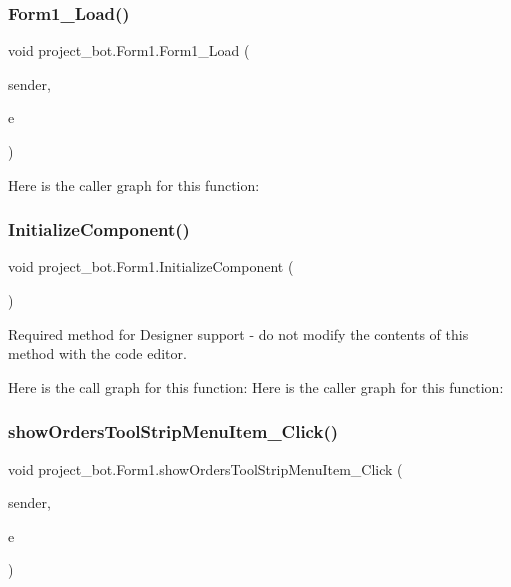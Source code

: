 \subsubsection{\texorpdfstring{Form1\+\_\+\+Load()}{Form1\_Load()}}
{\footnotesize\ttfamily void project\+\_\+bot.\+Form1.\+Form1\+\_\+\+Load (\begin{DoxyParamCaption}\item[{object}]{sender,  }\item[{Event\+Args}]{e }\end{DoxyParamCaption})\hspace{0.3cm}{\ttfamily [private]}}

Here is the caller graph for this function\+:
\mbox{\label{classproject__bot_1_1_form1_af9d680db4a881806f9fe79ba1c002df1}} 
\subsubsection{\texorpdfstring{Initialize\+Component()}{InitializeComponent()}}
{\footnotesize\ttfamily void project\+\_\+bot.\+Form1.\+Initialize\+Component (\begin{DoxyParamCaption}{ }\end{DoxyParamCaption})\hspace{0.3cm}{\ttfamily [private]}}



Required method for Designer support -\/ do not modify the contents of this method with the code editor. 

Here is the call graph for this function\+:
Here is the caller graph for this function\+:
\mbox{\label{classproject__bot_1_1_form1_a47e7e9a67932bbfafd59a75a6d511238}} 
\subsubsection{\texorpdfstring{show\+Orders\+Tool\+Strip\+Menu\+Item\+\_\+\+Click()}{showOrdersToolStripMenuItem\_Click()}}
{\footnotesize\ttfamily void project\+\_\+bot.\+Form1.\+show\+Orders\+Tool\+Strip\+Menu\+Item\+\_\+\+Click (\begin{DoxyParamCaption}\item[{object}]{sender,  }\item[{Event\+Args}]{e }\end{DoxyParamCaption})\hspace{0.3cm}{\ttfamily [private]}}

